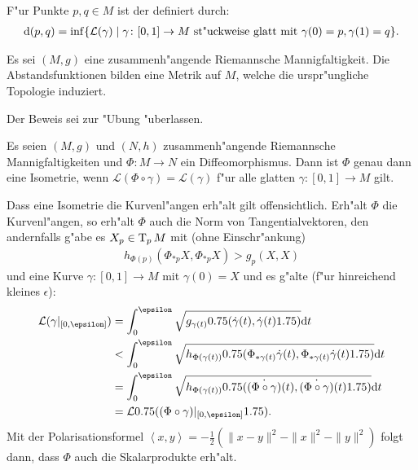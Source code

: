 \begin{Dfn}
  F"ur Punkte $p, q \in M$ ist der  definiert durch:
  \begin{align*}
    \mathrm{d}(p,q) = \inf\{ \mathcal L(\gamma) \mid \gamma \colon [0,1] \to M \text{ st"uckweise glatt mit } \gamma(0) = p, \gamma(1) = q\}.
  \end{align*}
\end{Dfn}

\begin{Satz}
  Es sei $(M,g)$ eine zusammenh"angende Riemannsche Mannigfaltigkeit.
  Die Abstandsfunktionen bilden eine Metrik auf $M$, welche die urspr"ungliche Topologie induziert.
\end{Satz}

Der Beweis sei zur "Ubung "uberlassen.

\begin{Satz}
  Es seien $(M,g)$ und $(N,h)$ zusammenh"angende Riemannsche Mannigfaltigkeiten und $\Phi \colon M \to N$ ein Diffeomorphismus.
  Dann ist $\Phi$ genau dann eine Isometrie, wenn $\mathcal L(\Phi \circ \gamma) = \mathcal L(\gamma)$ f"ur alle glatten $\gamma \colon [0,1] \to M$ gilt. 
\end{Satz}

\begin{bew}
  Dass eine Isometrie die Kurvenl"angen erh"alt gilt offensichtlich. Erh"alt $\Phi$ die Kurvenl"angen, so erh"alt $\Phi$ auch die Norm von Tangentialvektoren, den andernfalls g"abe es $X_p \in \operatorname{T}_pM$ mit (ohne Einschr"ankung)
  \begin{align*}
    h_{\Phi(p)}(\Phi_{*p}X,\Phi_{*p}X) > g_p(X,X)
  \end{align*}
  und eine Kurve $\gamma\colon [0,1] \to M$ mit $\gamma(0) = X$ und es g"alte (f"ur hinreichend kleines $\epsilon$):
  \begin{align*}
    \mathcal L(\gamma|_{[0,\epsilon]}) & = \int_0^{\epsilon}\sqrt{g_{\gamma(t)}\left(\dot\gamma(t),\dot\gamma(t)\right)}\dop t\\
    & < \int_0^{\epsilon}\sqrt{h_{\Phi(\gamma(t))} \left(\Phi_{*\gamma(t)}\dot\gamma(t), \Phi_{*\gamma(t)}\dot\gamma(t)\right)}\dop t\\
    & = \int_0^{\epsilon}\sqrt{h_{\Phi(\gamma(t))} \left(\dot{(\Phi \circ \gamma)}(t), \dot{(\Phi \circ \gamma)}(t) \right)}\dop t\\
    & = \mathcal L \left((\Phi \circ \gamma)|_{[0,\epsilon]}\right).
  \end{align*}
  Mit der Polarisationsformel $\left<x,y\right> = - \frac{1}2 (\|x-y\|^{2} - \|x\|^2-\|y\|^2)$ folgt dann, dass $\Phi$ auch die Skalarprodukte erh"alt.
\end{bew}

